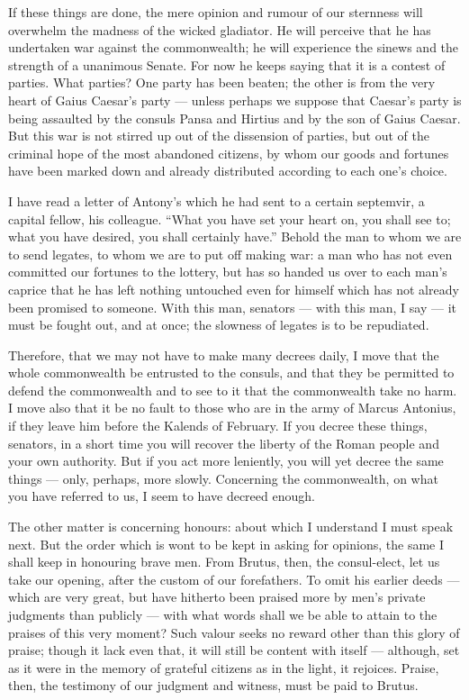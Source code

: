  If these things are done, the mere opinion and rumour of our sternness will overwhelm the madness of the wicked gladiator. He will perceive that he has undertaken war against the commonwealth; he will experience the sinews and the strength of a unanimous Senate. For now he keeps saying that it is a contest of parties. What parties? One party has been beaten; the other is from the very heart of Gaius Caesar's party --- unless perhaps we suppose that Caesar's party is being assaulted by the consuls Pansa and Hirtius and by the son of Gaius Caesar. But this war is not stirred up out of the dissension of parties, but out of the criminal hope of the most abandoned citizens, by whom our goods and fortunes have been marked down and already distributed according to each one's choice.

 I have read a letter of Antony's which he had sent to a certain septemvir, a capital fellow, his colleague. ``What you have set your heart on, you shall see to; what you have desired, you shall certainly have.'' Behold the man to whom we are to send legates, to whom we are to put off making war: a man who has not even committed our fortunes to the lottery, but has so handed us over to each man's caprice that he has left nothing untouched even for himself which has not already been promised to someone. With this man, senators --- with this man, I say --- it must be fought out, and at once; the slowness of legates is to be repudiated.

 Therefore, that we may not have to make many decrees daily, I move that the whole commonwealth be entrusted to the consuls, and that they be permitted to defend the commonwealth and to see to it that the commonwealth take no harm. I move also that it be no fault to those who are in the army of Marcus Antonius, if they leave him before the Kalends of February. If you decree these things, senators, in a short time you will recover the liberty of the Roman people and your own authority. But if you act more leniently, you will yet decree the same things --- only, perhaps, more slowly. Concerning the commonwealth, on what you have referred to us, I seem to have decreed enough.

 The other matter is concerning honours: about which I understand I must speak next. But the order which is wont to be kept in asking for opinions, the same I shall keep in honouring brave men. From Brutus, then, the consul-elect, let us take our opening, after the custom of our forefathers. To omit his earlier deeds --- which are very great, but have hitherto been praised more by men's private judgments than publicly --- with what words shall we be able to attain to the praises of this very moment? Such valour seeks no reward other than this glory of praise; though it lack even that, it will still be content with itself --- although, set as it were in the memory of grateful citizens as in the light, it rejoices. Praise, then, the testimony of our judgment and witness, must be paid to Brutus.

